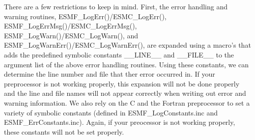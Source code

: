 %



There are a few restrictions to keep in mind.  First, the error handling and
warning routines, ESMF\_LogErr()/ESMC\_LogErr(), ESMF\_LogErrMsg()/ESMC\_LogErrMsg(),
ESMF\_LogWarn()/ESMC\_LogWarn(),
and ESMF\_LogWarnErr()/ESMC\_LogWarnErr(),
are expanded using a  macro's that adds the
predefined symbolic constants \_\_LINE\_\_ and \_\_FILE\_\_ to the argument list of the above
error handling routines. Using these constants, we can determine the line number and file that ther
error occurred in.  If
your preprocessor is not working properly, this expansion will not be done properly and
the line and file names will not appear correctly when writing out error and warning
information. We also rely on the C and the Fortran preprocessor
to set a variety of symbolic constants (defined in ESMF\_LogConstants.inc and 
ESMF\_ErrConstants.inc).  Again, if your preocessor is not working properly, these
constants will not be set properly. 
